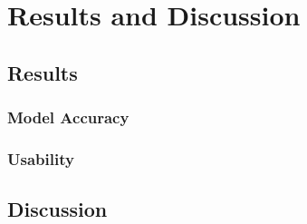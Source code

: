\chapter{Results and Discussion}


\section{Results}

\subsection{Model Accuracy}

\subsection{Usability}

\section{Discussion}


